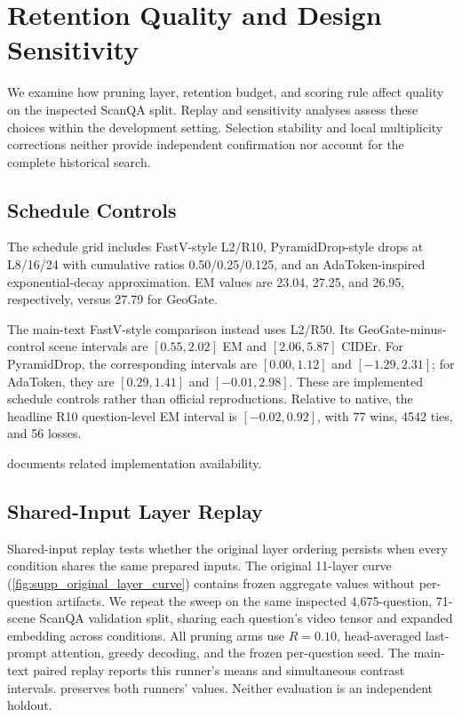 \section{Retention Quality and Design Sensitivity}
\label{sec:supp_quality}
We examine how pruning layer, retention budget, and scoring rule affect quality on the inspected ScanQA split. Replay and sensitivity analyses assess these choices within the development setting. Selection stability and local multiplicity corrections neither provide independent confirmation nor account for the complete historical search.


\subsection{Schedule Controls}
The schedule grid includes FastV-style L2/R10, PyramidDrop-style drops at L8/16/24 with cumulative ratios 0.50/0.25/0.125, and an AdaToken-inspired exponential-decay approximation. EM values are 23.04, 27.25, and 26.95, respectively, versus 27.79 for GeoGate.

The main-text FastV-style comparison instead uses L2/R50. Its GeoGate-minus-control scene intervals are $[0.55,2.02]$ EM and $[2.06,5.87]$ CIDEr. For PyramidDrop, the corresponding intervals are $[0.00,1.12]$ and $[-1.29,2.31]$; for AdaToken, they are $[0.29,1.41]$ and $[-0.01,2.98]$. These are implemented schedule controls rather than official reproductions. Relative to native, the headline R10 question-level EM interval is $[-0.02,0.92]$, with 77 wins, 4542 ties, and 56 losses.

 documents related implementation availability.

\subsection{Shared-Input Layer Replay}
\label{sec:supp_layer_replay}

Shared-input replay tests whether the original layer ordering persists when every condition shares the same prepared inputs. The original 11-layer curve (\cref{fig:supp_original_layer_curve}) contains frozen aggregate values without per-question artifacts. We repeat the sweep on the same inspected 4,675-question, 71-scene ScanQA validation split, sharing each question's video tensor and expanded embedding across conditions. All pruning arms use $R=0.10$, head-averaged last-prompt attention, greedy decoding, and the frozen per-question seed. The main-text paired replay reports this runner's means and simultaneous contrast intervals.  preserves both runners' values. Neither evaluation is an independent holdout.


